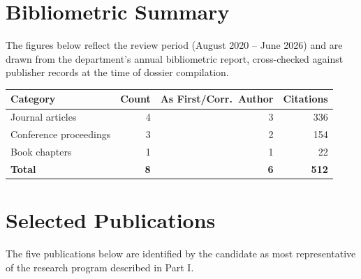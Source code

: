 
\section{Bibliometric Summary}
The figures below reflect the review period (August 2020 -- June 2026) and are drawn from the department's annual bibliometric report, cross-checked against publisher records at the time of dossier compilation.

\par
\begin{minipage}[t]{0.24\linewidth}
\end{minipage}\hfill
\begin{minipage}[t]{0.24\linewidth}
\end{minipage}\hfill
\begin{minipage}[t]{0.24\linewidth}
\end{minipage}\hfill
\begin{minipage}[t]{0.24\linewidth}
\end{minipage}
\par

\vspace{0.8em}
\begin{center}
\begin{tabularx}{\linewidth}{@{}Xrrr@{}}
\toprule
\textbf{Category} & \textbf{Count} & \textbf{As First/Corr.\ Author} & \textbf{Citations} \\
\midrule
Journal articles & 4 & 3 & 336 \\{}
Conference proceedings & 3 & 2 & 154 \\{}
Book chapters & 1 & 1 & 22 \\
\midrule
\textbf{Total} & \textbf{8} & \textbf{6} & \textbf{512} \\
\bottomrule
\end{tabularx}
\end{center}

\section{Selected Publications}
The five publications below are identified by the candidate as most representative of the research program described in Part I.

